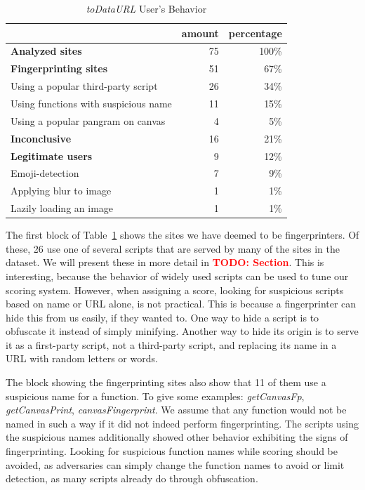 \documentclass[
    fontsize=12pt,
    headings=small,
    parskip=half,
    bibliography=totoc,
    numbers=noenddot,
    open=any
    ]{scrreprt}
\newcommand{\todo}[1]{\textcolor{red}{\textbf{TODO: #1}}}
\begin{document}
\begin{table}
\centering
\caption{\textit{toDataURL} User's Behavior}
\begin{tabular}{l r r}
    \toprule
    & amount & percentage \\
    \midrule
    \textbf{Analyzed sites} & 75 & 100\% \\
    \midrule
    \textbf{Fingerprinting sites} & 51 & 67\% \\
    Using a popular third-party script & 26 & 34\% \\
    Using functions with suspicious name & 11 & 15\% \\
    Using a popular pangram on canvas & 4 & 5\% \\
    \midrule
    \textbf{Inconclusive} & 16 & 21\% \\
    \midrule
    \textbf{Legitimate users} & 9 & 12\% \\
    Emoji-detection & 7 & 9\% \\
    Applying blur to image & 1 & 1\% \\
    Lazily loading an image & 1 & 1\% \\
    \bottomrule
\end{tabular}
\label{table:todataurl_users}
\end{table}

The first block of Table~\ref{table:todataurl_users} shows the sites
we have deemed to be fingerprinters. Of these, 26 use one of several scripts
that are served by many of the sites in the dataset. We will present these
in more detail in \todo{Section}. This is interesting, because
the behavior of widely used scripts can be used to tune our scoring system.
However, when assigning a score, looking for suspicious scripts based on
name or URL alone, is not practical. This is because a fingerprinter
can hide this from us easily, if they wanted to.
One way to hide a script is to obfuscate it instead of simply minifying.
Another way to hide its origin is to serve it as a first-party script,
not a third-party script, and replacing its name in a URL with random
letters or words.

The block showing the fingerprinting sites also show that 11 of them
use a suspicious name for a function. To give some examples:
\textit{getCanvasFp}, \textit{getCanvasPrint}, \textit{canvasFingerprint}.
We assume that any function would not be named in such a way if it did not
indeed perform fingerprinting.
The scripts using the suspicious names additionally showed other behavior
exhibiting the signs of fingerprinting.
Looking for suspicious function names while scoring should be avoided,
as adversaries can simply change the function names to avoid or
limit detection, as many scripts already do through obfuscation.
\end{document}
